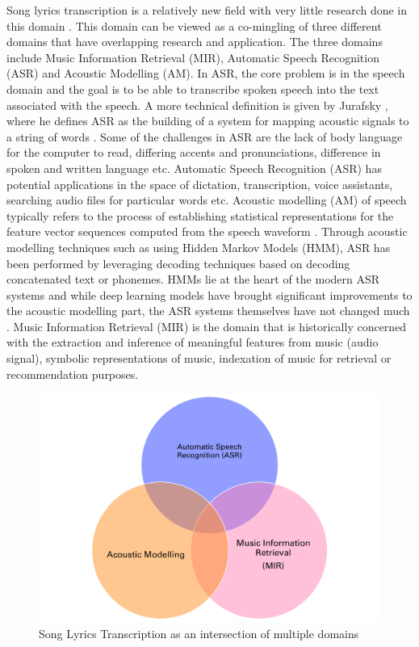 Song lyrics transcription is a relatively new field with very little research done in this domain \cite{gao2022automatic}. This domain can be viewed as a co-mingling of three different domains that have overlapping research and application. The three domains include Music Information Retrieval (MIR), Automatic Speech Recognition (ASR) and Acoustic Modelling (AM). In ASR, the core problem is in the speech domain and the goal is to be able to transcribe spoken speech into the text associated with the speech. A more technical definition is given by Jurafsky \cite{jurafsky2000speech} , where he defines ASR as the building of a system for mapping acoustic signals to a string of words \cite{jurafsky2000speech} . Some of the challenges in ASR  \cite{forsberg2003speech} are the lack of body language for the computer to read, differing accents and pronunciations, difference in spoken and written language etc. Automatic Speech Recognition (ASR) has potential applications in the space of dictation, transcription, voice assistants, searching audio files for particular words etc. Acoustic modelling (AM) of speech typically refers to the process of establishing statistical representations for the feature vector sequences computed from the speech waveform \cite{karpagavalli2016review}. Through acoustic modelling techniques such as using Hidden Markov Models (HMM), ASR has been performed by leveraging decoding techniques based on decoding concatenated text or phonemes. HMMs lie at the heart of the modern ASR systems and while deep learning models have brought significant improvements to the acoustic modelling part, the ASR systems themselves have not changed much \cite{gales2008application}. Music Information Retrieval (MIR) is the domain that is historically concerned with the extraction and inference of meaningful features from music (audio signal), symbolic representations of music, indexation of music for retrieval or recommendation purposes. 


\begin{figure}[H]
    \centering
    \includegraphics[width=\textwidth]{01-introduction/figures/between_three_domains.pdf}
    \caption{Song Lyrics Transcription as an intersection of multiple domains}%
    \label{fig:setup1}
\end{figure}

